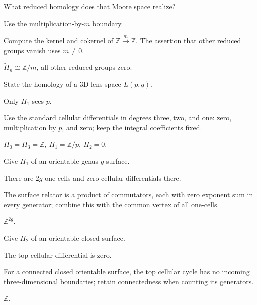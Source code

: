 \begin{exercise}\label{exr:viii18-18}
What reduced homology does that Moore space realize?
\end{exercise}
\begin{hint}
Use the multiplication-by-\(m\) boundary.

Compute the kernel and cokernel of \(\mathbb Z\xrightarrow{m}\mathbb Z\). The assertion that other reduced groups vanish uses \(m\ne0\).
\end{hint}
\begin{solution}
\(\widetilde H_n\cong\mathbb Z/m\), all other reduced groups zero.
\end{solution}

\begin{exercise}\label{exr:viii18-19}
State the homology of a 3D lens space \(L(p,q)\).
\end{exercise}
\begin{hint}
Only \(H_1\) sees \(p\).

Use the standard cellular differentials in degrees three, two, and one: zero, multiplication by \(p\), and zero; keep the integral coefficients fixed.
\end{hint}
\begin{solution}
\(H_0=H_3=\mathbb Z,\ H_1=\mathbb Z/p,\ H_2=0\).
\end{solution}

\begin{exercise}\label{exr:viii18-20}
Give \(H_1\) of an orientable genus-\(g\) surface.
\end{exercise}
\begin{hint}
There are \(2g\) one-cells and zero cellular differentials there.

The surface relator is a product of commutators, each with zero exponent sum in every generator; combine this with the common vertex of all one-cells.
\end{hint}
\begin{solution}
\(\mathbb Z^{2g}\).
\end{solution}

\begin{exercise}\label{exr:viii18-21}
Give \(H_2\) of an orientable closed surface.
\end{exercise}
\begin{hint}
The top cellular differential is zero.

For a connected closed orientable surface, the top cellular cycle has no incoming three-dimensional boundaries; retain connectedness when counting its generators.
\end{hint}
\begin{solution}
\(\mathbb Z\).
\end{solution}

